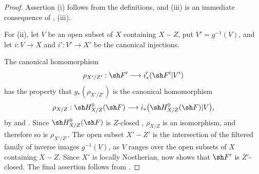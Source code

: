 \begin{proof}
Assertion {\rm(i)} follows from the definitions, and {\rm(iii)}
is an immediate consequence of , {\rm(iii)}.

For {\rm(ii)}, let $V$ be an open subset of $X$ containing
$X-Z$, put $V'=g^{-1}(V)$, and let
$i:V\to X$ and $i':V'\to X'$ be the canonical injections.


The canonical homomorphism
\[
  \rho_{X'/Z'}:\sh F'\longrightarrow i'_*(\sh F'|V')
\]
has the property that $g_*(\rho_{X'/Z'})$ is the canonical
homomorphism
\[
  \rho_{X/Z}:\sh H^0_{X/Z}(\sh F)
   \longrightarrow
   i_*\bigl(\sh H^0_{X/Z}(\sh F)|V\bigr),
\]
by  and .
Since $\sh H^0_{X/Z}(\sh F)$ is $Z$-closed
, $\rho_{X/Z}$ is an isomorphism, and therefore
so is $\rho_{X'/Z'}$.  The open subset $X'-Z'$ is the
intersection of the filtered family of inverse images
$g^{-1}(V)$, as $V$ ranges over the open subsets of $X$
containing $X-Z$.  Since $X'$ is locally Noetherian,
 now shows that $\sh F'$ is $Z'$-closed.
The final assertion follows from .
\end{proof}
